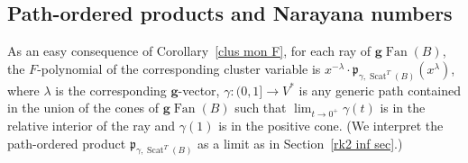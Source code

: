 \documentclass[ALCO,ThmDefs,Unicode,epreuves]{cedram}
\DeclareMathOperator{\Scat}{Scat}
\DeclareMathOperator{\Fan}{Fan}
\newcommand{\gFan}{\g\!\Fan}
\newcommand{\thet}{\vartheta}
\newcommand{\p}{{\mathfrak p}}
\newcommand{\g}{\mathbf{g}}
\renewcommand{\d}{{\mathfrak d}}
\begin{document}

\subsection{Path-ordered products and Narayana numbers}\label{Nar sec} 
As an easy consequence of Corollary~\ref{clus mon F}, for each ray of $\gFan(B)$, the $F$-polynomial of the corresponding cluster variable is $x^{-\lambda}\cdot\p_{\gamma,\Scat^T(B)}(x^\lambda)$, where $\lambda$ is the corresponding $\g$-vector, ${\gamma:(0,1]\to V^*}$ is any generic path contained in the union of the cones of $\gFan(B)$ such that $\lim_{t\to0^+}\gamma(t)$ is in the relative interior of the ray and $\gamma(1)$ is in the positive cone.
(We interpret the path-ordered product $\p_{\gamma,\Scat^T(B)}$ as a limit as in Section~\ref{rk2 inf sec}.)

\end{document}
